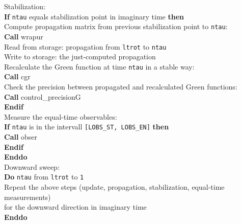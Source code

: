 \begin{mdframed}[frametitle={Basic structure of the auxiliary-field QMC implementation (\path{Prog/main.F90}):}]
{\hspace*{3em}  Stabilization: \\     
\hspace*{3em} \textbf{If} \texttt{ntau} equals stabilization point in imaginary time \textbf{then}\\
\hspace*{4em} Compute propagation matrix from previous stabilization point to \texttt{ntau}: \\
\hspace*{4em} \textbf{Call} wrapur\\
\hspace*{4em} Read from storage: propagation from \texttt{ltrot} to \texttt{ntau}\\
\hspace*{4em} Write to storage: the just-computed propagation \\
\hspace*{4em} Recalculate the Green function at time \texttt{ntau} in a stable way:\\
\hspace*{4em} \textbf{Call} cgr\\            
\hspace*{4em} Check the precision between propagated and recalculated Green functions:\\
\hspace*{4em} \textbf{Call} control\_precisionG\\
\hspace*{3em} \textbf{Endif}\\
    
\hspace*{3em} Measure the equal-time observables: \\
\hspace*{3em} \textbf{If} \texttt{ntau} is in the intervall \texttt{[LOBS\_ST, LOBS\_EN]} \textbf{then}\\
\hspace*{4em} \textbf{Call} obser\\
\hspace*{3em} \textbf{Endif}\\
\hspace*{2em} \textbf{Enddo}\\

\hspace*{2em} Downward sweep:\\
\hspace*{2em} \textbf{Do} \texttt{ntau} from \texttt{ltrot} to \texttt{1}\\
\hspace*{3em} Repeat the above steps (update, propagation, stabilization, equal-time measurements) \\
\hspace*{3em} for the downward direction in imaginary time\\
\hspace*{2em} \textbf{Enddo}\\

}
\end{mdframed}
